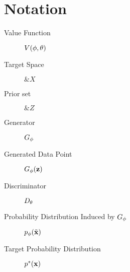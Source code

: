 \section*{Notation}
\vspace{3cm}
\begin{center}
  \begin{minipage}[c]{0.7\linewidth}
    \begin{center}
      \vspace{1cm}
      \begin{description}
      \item[Value Function] \hfill $V(\phi, \theta)$
      \end{description}
      \begin{description}
      \item[Target Space] \hfill $\&X$
      \item[Prior set] \hfill $\&Z$
      \end{description}
      \begin{description}
      \item[Generator] \hfill $G_\phi$
      \item[Generated Data Point] \hfill $G_\phi(\mathbf{z})$
      \item[Discriminator] \hfill $D_\theta$
      \end{description}
      \begin{description}
      \item[Probability Distribution Induced by $G_\phi$] \hfill $p_{\phi}(\tilde{\mathbf{x}})$
      \item[Target Probability Distribution] \hfill $p^*(\mathbf{x})$
      \end{description}
    \end{center}
  \end{minipage}
\end{center}

